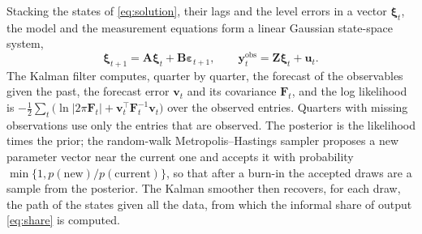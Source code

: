 Stacking the states of \eqref{eq:solution}, their lags and the level errors in a vector $\bm{\xi}_t$, the model and the measurement equations form a linear Gaussian state-space system,
\[
\bm{\xi}_{t+1} = \bm{A}\bm{\xi}_t + \bm{B}\bm{\varepsilon}_{t+1},\qquad \bm{y}^{\mathrm{obs}}_t = \bm{Z}\bm{\xi}_t + \bm{u}_t .
\]
The Kalman filter computes, quarter by quarter, the forecast of the observables given the past, the forecast error $\bm{v}_t$ and its covariance $\bm{F}_t$, and the log likelihood is $-\tfrac12\sum_t\big(\ln|2\pi\bm{F}_t| + \bm{v}_t^{\top}\bm{F}_t^{-1}\bm{v}_t\big)$ over the observed entries. Quarters with missing observations use only the entries that are observed. The posterior is the likelihood times the prior; the random-walk Metropolis--Hastings sampler proposes a new parameter vector near the current one and accepts it with probability $\min\{1, p(\text{new})/p(\text{current})\}$, so that after a burn-in the accepted draws are a sample from the posterior. The Kalman smoother then recovers, for each draw, the path of the states given all the data, from which the informal share of output \eqref{eq:share} is computed.

